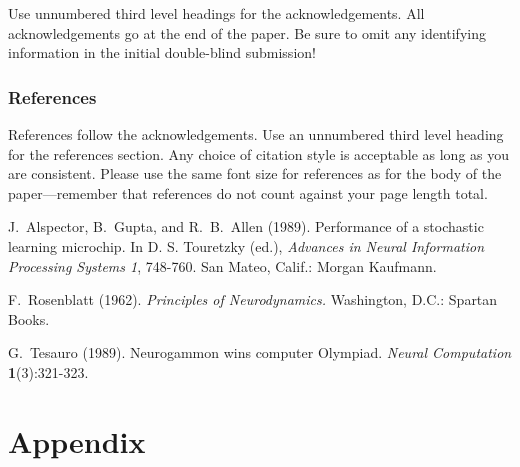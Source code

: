 \documentclass[twoside]{article} \usepackage{aistats2017}
\begin{document}
Use unnumbered third level headings for the acknowledgements.  All
acknowledgements go at the end of the paper.  Be sure to omit any
identifying information in the initial double-blind submission!


\subsubsection*{References}

References follow the acknowledgements.  Use an unnumbered third level
heading for the references section.  Any choice of citation style is
acceptable as long as you are consistent.  Please use the same font
size for references as for the body of the paper---remember that
references do not count against your page length total.

J.~Alspector, B.~Gupta, and R.~B.~Allen (1989). Performance of a
stochastic learning microchip.  In D. S. Touretzky (ed.), {\it
  Advances in Neural Information Processing Systems 1}, 748-760.  San
Mateo, Calif.: Morgan Kaufmann.

F.~Rosenblatt (1962). {\it Principles of Neurodynamics.} Washington,
D.C.: Spartan Books.

G.~Tesauro (1989). Neurogammon wins computer Olympiad.  {\it Neural
  Computation} {\bf 1}(3):321-323.


\section{Appendix}
\end{document}
